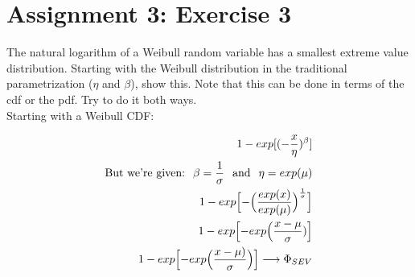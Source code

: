 \documentclass{article}
\begin{document}
\section{Assignment 3: Exercise 3}

The natural logarithm of a Weibull random variable has a smallest extreme value distribution.  Starting with the Weibull distribution in the traditional parametrization (\(\eta \) and \(\beta \)), show this.  Note that this can be done in terms of the cdf or the pdf.  Try to do it both ways.\\

Starting with a Weibull CDF:\\

\begin{Large}
  \begin{align}
      1 - exp[(-\frac{x}{\eta})^{\beta}]\\
      \text{But we're given:} \hspace{.25 cm} 
                            \beta = \frac{1}{\sigma} 
                              \hspace{.25 cm}  \text{and} \hspace{.25 cm}
                             \eta = exp(\mu)\\
      1 - exp\Bigl[-\Bigl(\frac{exp(x)}{exp(\mu)}\Bigr)^{\frac{1}{\sigma}}\Bigr]\\
      1 - exp\Bigl[-exp\Bigl(\frac{x - \mu}{\sigma})\Bigr]\\
      1 - exp\Bigl[-exp\Bigl(\frac{x - \mu)}{\sigma}\Bigr)\Bigr] \longrightarrow \Phi_{SEV}
  \end{align}
\end{Large}
\end{document}
